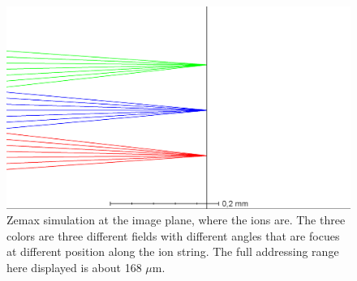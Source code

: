 \begin{figure}
     \centering
     \centering
     \includegraphics[width=.8\textwidth]{img/zemaxrange}
     \caption{Zemax simulation at the image plane, where the ions are. The three colors are three different fields with different angles that are focues at different position along the ion string. The full addressing range here displayed is about 168 $\mu$m.}
     \label{zemaxrange}
\end{figure}

